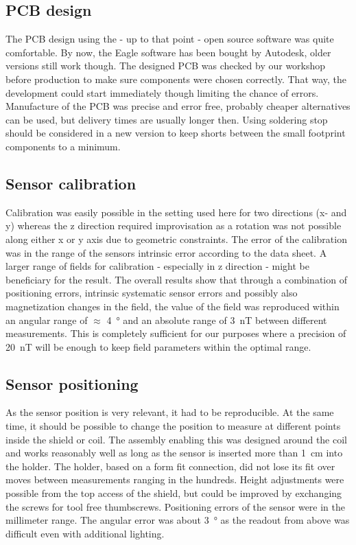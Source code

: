         \subsection{PCB design}
            The PCB design using the - up to that point - open source software was quite comfortable. By now, the Eagle software has been bought by Autodesk, older versions still work though. The designed PCB was checked by our workshop before production to make sure components were chosen correctly. That way, the development could start immediately though limiting the chance of errors. Manufacture of the PCB was precise and error free, probably cheaper alternatives can be used, but delivery times are usually longer then. Using soldering stop should be considered in a new version to keep shorts between the small footprint components to a minimum.
        \subsection{Sensor calibration}
            Calibration was easily possible in the setting used here for two directions (x- and y) whereas the z direction required improvisation as a rotation was not possible along either x or y axis due to geometric constraints. The error of the calibration was in the range of the sensors intrinsic error according to the data sheet. A larger range of fields for calibration - especially in z direction - might be beneficiary for the result.
            The overall results show that through a combination of positioning errors, intrinsic systematic sensor errors and possibly also magnetization changes in the field, the value of the field was reproduced within an angular range of $\approx$ \SI{4}{\degree} and an absolute range of \SI{3}{\nano\tesla} between different measurements. This is completely sufficient for our purposes where a precision of \SI{20}{\nano\tesla} will be enough to keep field parameters within the optimal range.
        \subsection{Sensor positioning}
            As the sensor position is very relevant, it had to be reproducible. At the same time, it should be possible to change the position to measure at different points inside the shield or coil. The assembly enabling this was designed around the coil and works reasonably well as long as the sensor is inserted more than \SI{1}{\centi\meter} into the holder. The holder, based on a form fit connection, did not lose its fit over moves between measurements ranging in the hundreds. Height adjustments were possible from the top access of the shield, but could be improved by exchanging the screws for tool free thumbscrews. Positioning errors of the sensor were in the millimeter range. The angular error was about \SI{3}{\degree} as the readout from above was difficult even with additional lighting.

